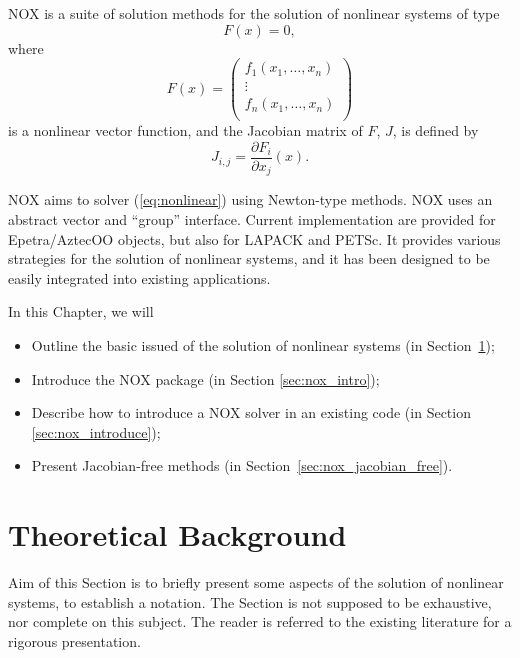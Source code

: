 \begin{introchapter}
NOX is a suite of solution methods for the solution of nonlinear
systems of type
\begin{equation}
\label{eq:nonlinear}
F(x) = 0,
\end{equation}
where
\[
F(x) = 
\begin{pmatrix}
  f_1(x_1, \ldots, x_n) \\
  \vdots \\
  f_n(x_1, \ldots, x_n) \\
\end{pmatrix}
\]
is a nonlinear vector function, and the Jacobian matrix of $F$, $J$, is
defined by
\[
J_{i,j} = \frac{ \partial F_i}{\partial x_j} (x).
\]

NOX aims to solver (\ref{eq:nonlinear}) using Newton-type methods. NOX
uses an abstract vector and ``group'' interface. Current implementation
are provided for Epetra/AztecOO objects, but also for LAPACK and PETSc.
It provides various strategies for the solution of nonlinear systems,
and it has been designed to be easily integrated into existing
applications.

In this Chapter, we will
\begin{itemize}
\item Outline the basic issued of the  solution of nonlinear
  systems (in Section~\ref{sec:nox_theoretical});
\item Introduce the NOX package (in Section \ref{sec:nox_intro});
\item Describe how to introduce a NOX solver in an existing code (in
  Section \ref{sec:nox_introduce});
\item Present Jacobian-free methods (in
  Section~\ref{sec:nox_jacobian_free}).
\end{itemize}
\end{introchapter}


\section{Theoretical Background}
\label{sec:nox_theoretical}

Aim of this Section is to briefly present some aspects of the solution
of nonlinear systems, to establish a notation. The Section is not
supposed to be exhaustive, nor complete on this subject. The reader is
referred to the existing literature for a rigorous presentation.

\medskip

